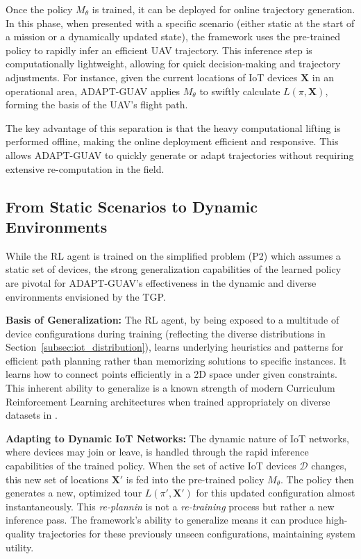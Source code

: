 \documentclass[10pt,conference,letterpaper]{IEEEtran}
\begin{document}
Once the policy $M_{\theta}$ is trained, it can be deployed for online trajectory generation. In this phase, when presented with a specific scenario (either static at the start of a mission or a dynamically updated state), the framework uses the pre-trained policy to rapidly infer an efficient UAV trajectory. This inference step is computationally lightweight, allowing for quick decision-making and trajectory adjustments. For instance, given the current locations of IoT devices $\mathbf{X}$ in an operational area, ADAPT-GUAV applies $M_{\theta}$ to swiftly calculate $L(\pi, \mathbf{X})$, forming the basis of the UAV's flight path.

The key advantage of this separation is that the heavy computational lifting is performed offline, making the online deployment efficient and responsive. This allows ADAPT-GUAV to quickly generate or adapt trajectories without requiring extensive re-computation in the field.

\subsection{From Static Scenarios to Dynamic Environments}

While the RL agent is trained on the simplified problem (P2) which assumes a static set of devices, the strong generalization capabilities of the learned policy are pivotal for ADAPT-GUAV's effectiveness in the dynamic and diverse environments envisioned by the TGP.

\textbf{Basis of Generalization:} The RL agent, by being exposed to a multitude of device configurations during training (reflecting the diverse distributions in Section~\ref{subsec:iot_distribution}), learns underlying heuristics and patterns for efficient path planning rather than memorizing solutions to specific instances. It learns how to connect points efficiently in a 2D space under given constraints. This inherent ability to generalize is a known strength of modern Curriculum Reinforcement Learning architectures when trained appropriately on diverse datasets in \cite{DBLP:conf/aaai/ZhangZW022}.

\textbf{Adapting to Dynamic IoT Networks:} The dynamic nature of IoT networks, where devices may join or leave, is handled through the rapid inference capabilities of the trained policy. When the set of active IoT devices $\mathcal{D}$ changes, this new set of locations $\mathbf{X}'$ is fed into the pre-trained policy $M_{\theta}$. The policy then generates a new, optimized tour $L(\pi', \mathbf{X}')$ for this updated configuration almost instantaneously. This \textit{re-plannin} is not a \textit{re-training} process but rather a new inference pass. The framework's ability to generalize means it can produce high-quality trajectories for these previously unseen configurations, maintaining system utility.
\end{document}
